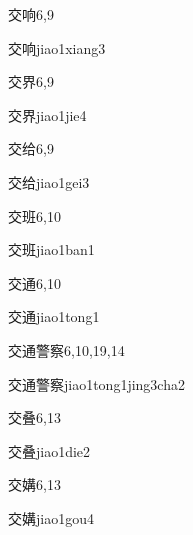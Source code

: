 \begin{entry}{交响}{6,9}
  \begin{phonetics}{交响}{jiao1xiang3}
  \end{phonetics}
\end{entry}

\begin{entry}{交界}{6,9}
  \begin{phonetics}{交界}{jiao1jie4}
  \end{phonetics}
\end{entry}

\begin{entry}{交给}{6,9}
  \begin{phonetics}{交给}{jiao1gei3}
  \end{phonetics}
\end{entry}

\begin{entry}{交班}{6,10}
  \begin{phonetics}{交班}{jiao1ban1}
  \end{phonetics}
\end{entry}

\begin{entry}{交通}{6,10}
  \begin{phonetics}{交通}{jiao1tong1}
  \end{phonetics}
\end{entry}

\begin{entry}{交通警察}{6,10,19,14}
  \begin{phonetics}{交通警察}{jiao1tong1jing3cha2}
  \end{phonetics}
\end{entry}

\begin{entry}{交叠}{6,13}
  \begin{phonetics}{交叠}{jiao1die2}
  \end{phonetics}
\end{entry}

\begin{entry}{交媾}{6,13}
  \begin{phonetics}{交媾}{jiao1gou4}
  \end{phonetics}
\end{entry}

